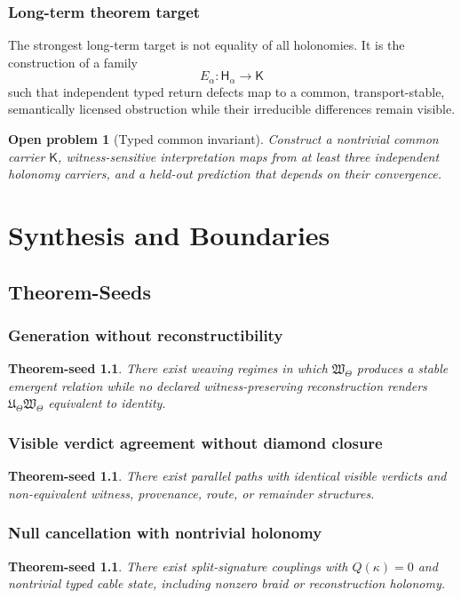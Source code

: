 \documentclass[12pt,openany]{book}
\newtheorem{theoremseed}[definition]{Theorem-seed}
\newtheorem{openproblem}[definition]{Open problem}
\theoremstyle{remark}
\newcommand{\WTheta}{\mathfrak W_{\Theta}}
\newcommand{\UTheta}{\mathfrak U_{\Theta}}
\begin{document}
\section{Long-term theorem target}
The strongest long-term target is not equality of all holonomies. It is the construction of a family
\[
E_\alpha:\mathsf H_\alpha\to\mathsf K
\]
such that independent typed return defects map to a common, transport-stable, semantically licensed obstruction while their irreducible differences remain visible.

\begin{openproblem}[Typed common invariant]
Construct a nontrivial common carrier $\mathsf K$, witness-sensitive interpretation maps from at least three independent holonomy carriers, and a held-out prediction that depends on their convergence.
\end{openproblem}

\part{Synthesis and Boundaries}

\chapter{Theorem-Seeds}
\label{ch:theorem-seeds}

\section{Generation without reconstructibility}
\begin{theoremseed}
There exist weaving regimes in which $\WTheta$ produces a stable emergent relation while no declared witness-preserving reconstruction renders $\UTheta\WTheta$ equivalent to identity.
\end{theoremseed}

\section{Visible verdict agreement without diamond closure}
\begin{theoremseed}
There exist parallel paths with identical visible verdicts and non-equivalent witness, provenance, route, or remainder structures.
\end{theoremseed}

\section{Null cancellation with nontrivial holonomy}
\begin{theoremseed}
There exist split-signature couplings with $Q(\kappa)=0$ and nontrivial typed cable state, including nonzero braid or reconstruction holonomy.
\end{theoremseed}
\end{document}
